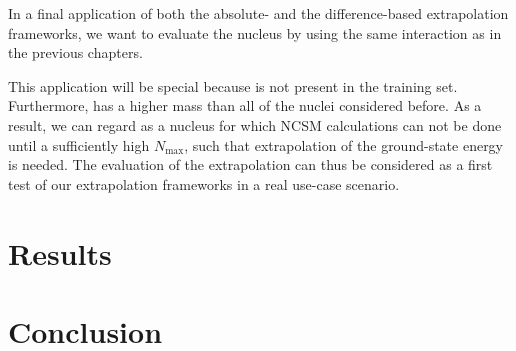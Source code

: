 In a final application of both the absolute- and the difference-based extrapolation frameworks, we want to evaluate the nucleus  by using the same interaction as in the previous chapters.

This application will be special because  is not present in the training set. Furthermore,  has a higher mass than all of the nuclei considered before. As a result, we can regard  as a nucleus for which NCSM calculations can not be done until a sufficiently high $N_\mathrm{max}$, such that extrapolation of the ground-state energy is needed. The evaluation of the  extrapolation can thus be considered as a first test of our extrapolation frameworks in a real use-case scenario.
\section{Results}

\section{Conclusion}

